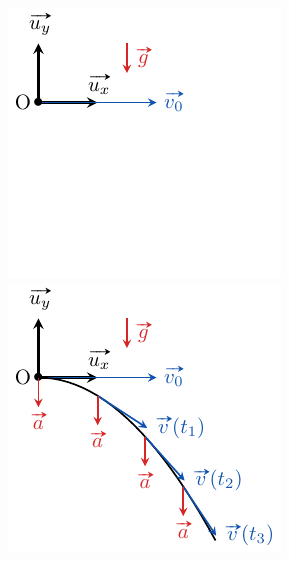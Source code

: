 \documentclass[../../main/main.tex]{subfiles}
\begin{document}
\begin{tcb*}
\begin{enumerate}[label=\sqenumi]
\begin{isd}
\begin{center}
{                  \includegraphics[width=\linewidth]{vo_traj_stud}
                }{%
					        \includegraphics[width=\linewidth]{vo_traj_prof}
                }%
                \vspace{-15pt}
				      \end{center}
			      \end{isd}
		\end{enumerate}
\end{tcb*}
\end{document}
